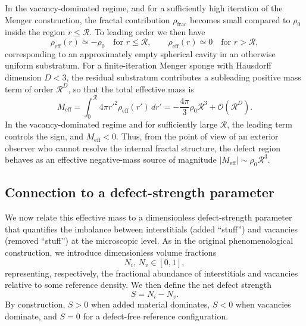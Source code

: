 \documentclass[%
  reprint,
  superscriptaddress,
  showpacs,
  showkeys,
  amsmath,amssymb,
  pra,
  longbibliography,
  floatfix,
  x11names
]{revtex4-2}
\begin{document}
In the vacancy-dominated regime, and for a sufficiently high iteration of the Menger construction, the fractal contribution $\rho_{\text{frac}}$ becomes small compared to $\rho_0$ inside the region $r\le \mathcal{R}$. To leading order we then have
\begin{equation}
\rho_{\text{eff}}(r) \simeq -\rho_0 \quad \text{for } r\le\mathcal{R},
\qquad
\rho_{\text{eff}}(r) \simeq 0 \quad \text{for } r>\mathcal{R},
\end{equation}
corresponding to an approximately empty spherical cavity in an otherwise uniform substratum. For a finite-iteration Menger sponge with Hausdorff dimension $D<3$, the residual substratum contributes a subleading positive mass term of order $\mathcal{R}^D$, so that the total effective mass is
\begin{equation}
M_{\text{eff}}
= \int_0^{\mathcal{R}} 4\pi r'^2 \rho_{\text{eff}}(r') \, dr'
= -\frac{4\pi}{3} \rho_0 \mathcal{R}^3 + \mathcal{O}(\mathcal{R}^D).
\label{eq:Meff}
\end{equation}
In the vacancy-dominated regime and for sufficiently large $\mathcal{R}$, the leading term controls the sign, and $M_{\text{eff}}<0$. Thus, from the point of view of an exterior observer who cannot resolve the internal fractal structure, the defect region behaves as an effective negative-mass source of magnitude $|M_{\text{eff}}| \sim \rho_0 \mathcal{R}^3$.

\subsection{Connection to a defect-strength parameter}
\label{sec:defect-source}

We now relate this effective mass to a dimensionless defect-strength parameter that quantifies the imbalance between interstitials (added ``stuff'') and vacancies (removed ``stuff'') at the microscopic level. As in the original phenomenological construction, we introduce dimensionless volume fractions
\begin{equation}
N_i,\,N_v \in [0,1],
\end{equation}
representing, respectively, the fractional abundance of interstitials and vacancies relative to some reference density. We then define the net defect strength
\begin{equation}
S = N_i - N_v.
\end{equation}
By construction, $S>0$ when added material dominates, $S<0$ when vacancies dominate, and $S=0$ for a defect-free reference configuration.
\end{document}
